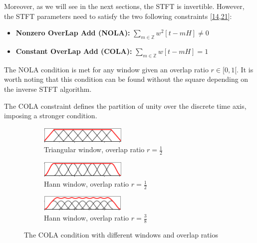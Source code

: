 \documentclass[
  american,
]{article}
\providecommand{\tightlist}{%
  \setlength{\itemsep}{0pt}\setlength{\parskip}{0pt}}
\begin{document}
Moreover, as we will see in the next sections, the STFT is invertible.
However, the STFT parameters need to satisfy the two following constraints {[}\protect\hyperlink{ref-griffin1983}{14},\protect\hyperlink{ref-muller2015}{21}{]}:

\begin{itemize}
\tightlist
\item
  \textbf{Nonzero OverLap Add (NOLA):} \(\sum\limits_{m\in\mathbb{Z}} w^2[t-mH] \neq 0\)
\item
  \textbf{Constant OverLap Add (COLA):} \(\sum\limits_{m\in\mathbb{Z}} w[t-mH] = 1\)
\end{itemize}

The NOLA condition is met for any window given an overlap ratio \(r\in[0,1[\).
It is worth noting that this condition can be found without the square
depending on the inverse STFT algorithm.

The COLA constraint defines the partition of unity over the discrete time axis,
imposing a stronger condition.

\begin{figure}[H]
    \centering
    \begin{subfigure}[t]{\textwidth}
        \centering
        \includegraphics[width=0.45\textwidth]{img/woa_triangular_1_2.png}
        \caption{Triangular window, overlap ratio $r=\frac{1}{2}$}
    \end{subfigure}
    \begin{subfigure}[t]{\textwidth}
        \centering
        \includegraphics[width=0.45\textwidth]{img/woa_hann_1_2.png}
        \caption{Hann window, overlap ratio $r=\frac{1}{2}$}
    \end{subfigure}
    \begin{subfigure}[t]{\textwidth}
        \centering
        \includegraphics[width=0.45\textwidth]{img/woa_hann_3_8.png}
        \caption{Hann window, overlap ratio $r=\frac{3}{8}$}
    \end{subfigure}
    \caption{The COLA condition with different windows and overlap ratios}
\end{figure}
\end{document}
